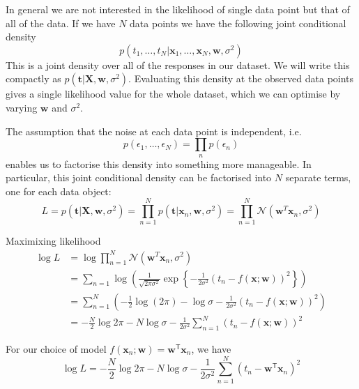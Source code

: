 \documentclass[a4paper,11pt]{article} %
\begin{document}
In general we are not interested in the likelihood of single data point but that of
all of the data. If we have $N$ data points we have the following joint conditional
density
\begin{equation*}
p(t_{1}, \ldots, t_{N} | \mathbf{x}_{1}, \ldots, \mathbf{x}_{N}, \mathbf{w}, \sigma^2)
\end{equation*}
This is a joint density over all of the responses in our dataset.
We will write this compactly
as $p( \mathbf{t} | \mathbf{X}, \mathbf{w}, \sigma^2)$.
Evaluating this density at the observed data points gives a single
likelihood value for the whole dataset, which we can optimise by varying $\mathbf{w}$
and $\sigma^2$.

The assumption that the noise at each data point is independent, i.e.
\begin{equation*}
p(\epsilon_{1}, \ldots, \epsilon_{N}) = \prod_{n} p(\epsilon_{n})
\end{equation*}
enables us to factorise this density into something more manageable. In
particular, this joint conditional density can be factorised into $N$ separate terms,
one for each data object:
\begin{equation}
L = p(\mathbf{t} | \mathbf{X},\mathbf{w},\sigma^2)
= \prod_{n=1}^{N} p(\mathbf{t} | \mathbf{x}_{n},\mathbf{w},\sigma^2)
= \prod_{n=1}^{N} \mathcal{N}(\mathbf{w}^{T}\mathbf{x}_{n},\sigma^2)
\end{equation}

Maximixing likelihood
\begin{align*}
\log L & = \log \prod_{n=1}^{N} \mathcal{N}(\mathbf{w}^{T}\mathbf{x}_{n},\sigma^2) \\
& = \sum_{n=1} \log \left( \frac{1}{\sqrt{2\pi\sigma^2}}
\exp\left\{ -\frac{1}{2\sigma^2}
\left( t_{n} - f(\mathbf{x};\mathbf{w}) \right)^2
\right\} \right) \\
& = \sum_{n=1}^{N} \left(
-\frac{1}{2}\log(2\pi) - \log\sigma - \frac{1}{2\sigma^2}
\left( t_{n} - f(\mathbf{x};\mathbf{w}) \right)^2 \right) \\
& = -\frac{N}{2}\log 2\pi - N\log\sigma - \frac{1}{2\sigma^2}
\sum_{n=1}^{N} \left( t_{n} - f(\mathbf{x};\mathbf{w}) \right)^2
\end{align*}

For our choice of model
$f(\mathbf{x}_{n}; \mathbf{w}) = \mathbf{w}^{\mathsf{T}}\mathbf{x}_{n}$, we have
\begin{equation}
\log L = -\frac{N}{2} \log 2\pi - N\log\sigma - \frac{1}{2\sigma^2}
\sum_{n=1}^{N} \left( t_{n} - \mathbf{w}^{\mathsf{T}}\mathbf{x}_{n} \right)^2
\end{equation}
\end{document}
